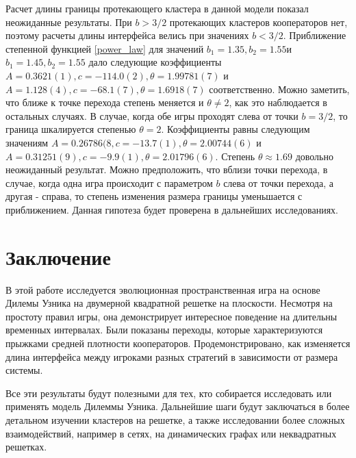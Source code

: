\documentclass[a4paper]{article}
\begin{document}
	\par Расчет длины границы протекающего кластера в данной модели показал неожиданные результаты. При $b>3/2$ протекающих кластеров кооператоров нет, поэтому расчеты длины интерфейса велись при значениях $b<3/2$. Приближение степенной функцией \ref{power_law} для значений $b_{1}=1.35, b_{2}=1.55 $и $ b_{1}=1.45, b_{2}=1.55$ дало следующие коэффициенты  $A=0.3621(1) ,c=-114.0(2), \theta=1.99781(7)$ и $A=1.128(4) ,c=-68.1(7), \theta=1.6918(7)$ соответственно. Можно заметить, что ближе к точке перехода степень меняется и $\theta \neq 2$, как это наблюдается в остальных случаях. В случае, когда обе игры проходят слева от точки $b=3/2$, то граница шкалируется степенью $\theta = 2$. Коэффициенты равны следующим значениям $A= 0.26786(8 ,c=-13.7(1), \theta=2.00744(6)$ и $A=0.31251(9) ,c=-9.9(1), \theta=2.01796(6)$. Степень $\theta \approx 1.69$ довольно неожиданный результат. Можно предположить, что вблизи точки перехода, в случае, когда одна игра происходит с параметром $b$ слева от точки перехода, а другая - справа, то степень изменения размера границы уменьшается с приближением. Данная гипотеза будет проверена в дальнейших исследованиях. 
	\section{Заключение}
	
	\par В этой работе исследуется эволюционная пространственная игра на основе Дилемы Узника на двумерной квадратной решетке на плоскости. Несмотря на простоту правил игры, она демонстрирует интересное поведение на длительны временных интервалах. Были показаны переходы, которые  характеризуются прыжками средней плотности кооператоров. Продемонстрировано, как изменяется длина интерфейса между игроками разных стратегий в зависимости от размера системы. 
	
	\par Все эти результаты будут полезными для тех, кто собирается исследовать или применять модель Дилеммы Узника. Дальнейшие шаги будут заключаться в более детальном изучении кластеров на решетке, а также исследовании более сложных взаимодействий, например в сетях, на динамических графах или неквадратных решетках.
\end{document}
